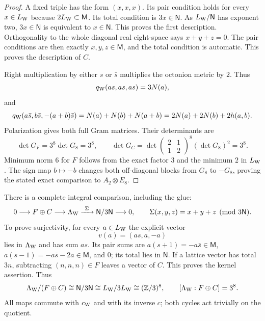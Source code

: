\begin{proof}
A fixed triple has the form $(x,x,x)$. Its pair condition holds for
every $x\in L_{\rm W}$ because $2L_{\rm W}\subset\mathsf M$.
Its total condition is $3x\in\mathsf N$. As $L_{\rm W}/\mathsf N$
has exponent two, $3x\in\mathsf N$ is equivalent to $x\in\mathsf N$.
This proves the first description. Orthogonality to the whole
diagonal real eight-space says $x+y+z=0$. The pair conditions are
then exactly $x,y,z\in\mathsf M$, and the total condition is automatic.
This proves the description of $C$.

Right multiplication by either $s$ or $\bar s$ multiplies the
octonion metric by $2$. Thus
\[
 q_{\rm W}(as,as,as)=3N(a),
\]
and
\[
 q_{\rm W}(a\bar s,b\bar s,-(a+b)\bar s)
 =N(a)+N(b)+N(a+b)=2N(a)+2N(b)+2h(a,b).
\]
Polarization gives both full Gram matrices. Their determinants are
\[
 \det G_F=3^8\det G_8=3^8,\qquad
 \det G_C=\det\begin{pmatrix}2&1\\1&2\end{pmatrix}^{8}
 (\det G_8)^2=3^8.
\]
Minimum norm $6$ for $F$ follows from the exact
factor $3$ and the minimum $2$ in $L_{\rm W}$.
The sign map $b\mapsto-b$ changes both off-diagonal blocks from
$G_8$ to $-G_8$, proving the stated exact comparison to
$A_2\otimes E_8$.
\end{proof}

There is a complete integral comparison, including the glue:
\begin{equation}
 0\longrightarrow F\oplus C\longrightarrow\Lambda_{\rm W}
 \xrightarrow{\ \Sigma\ }\mathsf N/3\mathsf N
 \longrightarrow0,\qquad
 \Sigma(x,y,z)=x+y+z\pmod{3\mathsf N}.
 \label{wcl:eq:three-primary-exact}
\end{equation}
To prove surjectivity, for every $a\in L_{\rm W}$ the explicit vector
\[
 v(a)=(as,a,-a)
\]
lies in $\Lambda_{\rm W}$ and has sum $as$. Its pair sums are
$a(s+1)=-a\bar s\in\mathsf M$,
$a(s-1)=-a\bar s-2a\in\mathsf M$, and $0$;
its total lies in $\mathsf N$. If a lattice vector has total $3n$,
subtracting $(n,n,n)\in F$ leaves a vector of $C$. This proves the
kernel assertion. Thus
\[
 \Lambda_{\rm W}/(F\oplus C)\cong\mathsf N/3\mathsf N
 \cong L_{\rm W}/3L_{\rm W}\cong(\mathbb Z/3)^8,\qquad
 [\Lambda_{\rm W}:F\oplus C]=3^8.
\]
All maps commute with $c_{\rm W}$ and with its inverse $c$; both
cycles act trivially on the quotient.

